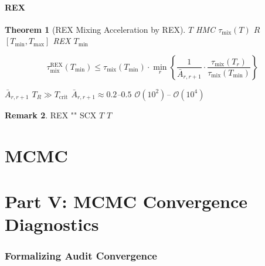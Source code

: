 \documentclass[12pt,a4paper]{article}
\theoremstyle{plain}
\newtheorem{theorem}{ Theorem}[section]
\theoremstyle{definition}
\newtheorem{remark}[theorem]{ Remark}
\newcommand{\Ocal}{\mathcal{O}}
\begin{document}
\subsection{REX }

\begin{theorem}[REX  Mixing Acceleration by REX]
\label{thm:rex_mixing}
 $T$  HMC  $\tau_{\text{mix}}(T)$ $R$ 
 $[T_{\min}, T_{\max}]$  REX $T_{\min}$


\begin{equation}\label{eq:rex_mixing_time}
    \tau_{\text{mix}}^{\text{REX}}(T_{\min}) \leq
    \tau_{\text{mix}}(T_{\min}) \cdot \min_{r} \left\{
        \frac{1}{\bar{A}_{r,r+1}} \cdot
        \frac{\tau_{\text{mix}}(T_r)}{\tau_{\text{mix}}(T_{\min})}
    \right\}
\end{equation}

 $\bar{A}_{r,r+1}$  $T_R \gg T_{\text{crit}}$
 $\bar{A}_{r,r+1} \approx 0.2$–$0.5$  $\Ocal(10^2)$–
$\Ocal(10^4)$
\end{theorem}

\begin{remark}
REX \textbf{}
"" SCX  $T$
 $T$
\end{remark}

\newpage


\part{MCMC }
\part*{Part V: MCMC Convergence Diagnostics}

\section{}
\section*{Formalizing Audit Convergence}

\subsection{}
\end{document}
